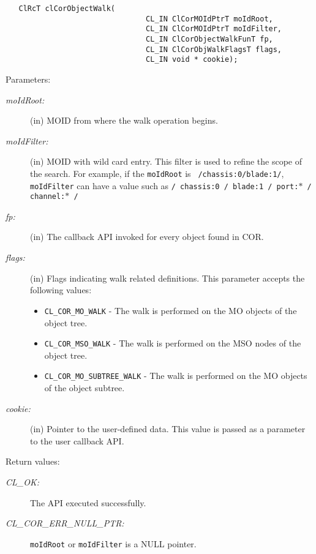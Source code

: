 \begin{flushleft}
\begin{Desc}
\footnotesize\begin{verbatim}   ClRcT clCorObjectWalk(
                           		CL_IN ClCorMOIdPtrT moIdRoot,
                           		CL_IN ClCorMOIdPtrT moIdFilter,
                           		CL_IN ClCorObjectWalkFunT fp,
                           		CL_IN ClCorObjWalkFlagsT flags,
                           		CL_IN void * cookie);
\end{verbatim}
\normalsize
\end{Desc}
\begin{Desc}
\item[Parameters:]
\begin{description}
\item[{\em moId\-Root:}](in) MOID from where the walk operation begins. 
\item[{\em moId\-Filter:}](in) MOID with wild card entry. This filter is used to refine the scope of the search. For example, if the {\tt{moIdRoot}} is 
{\tt{ /chassis:0/blade:1/}}, {\tt{moIdFilter}} can have a value such as {\tt{/ chassis:0 / blade:1 / port:$\ast$ / channel:$\ast$ /}} 
\item[{\em fp:}](in) The callback API invoked for every object found in COR.
\item[{\em flags:}](in) Flags indicating walk related definitions. This parameter accepts the following values: 
\begin{itemize}
\item {\tt CL\_\-COR\_\-MO\_\-WALK} - The walk is performed on the MO objects of the object tree.
\item {\tt CL\_\-COR\_\-MSO\_\-WALK} -  The walk is performed on the MSO nodes of the object tree.
\item {\tt CL\_\-COR\_\-MO\_\-SUBTREE\_\-WALK} - The walk is performed on the MO objects of the object subtree.
\end{itemize}
\item[{\em cookie:}](in) Pointer to the user-defined data. This value is passed as a parameter to the user callback API.\end{description}
\end{Desc}
\begin{Desc}
\item[Return values:]
\begin{description}
\item[{\em CL\_\-OK:}]The API executed successfully. 
\item[{\em CL\_\-COR\_\-ERR\_\-NULL\_\-PTR:}]{\tt{moIdRoot}} or {\tt{moIdFilter}} is a NULL pointer. 

\end{description}
\end{Desc}
\end{flushleft}

